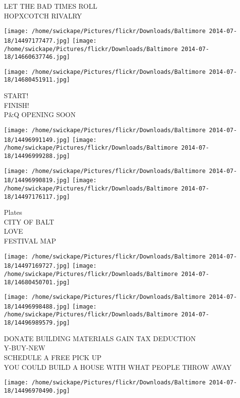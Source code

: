 \documentclass[10pt,letterpaper]{article}
\begin{document}
LET THE BAD TIMES ROLL\\
HOPXCOTCH RIVALRY\\
\pagebreak

\texttt{[image: /home/swickape/Pictures/flickr/Downloads/Baltimore 2014-07-18/14497177477.jpg]}
\texttt{[image: /home/swickape/Pictures/flickr/Downloads/Baltimore 2014-07-18/14660637746.jpg]}

\vspace{0.25in}
\texttt{[image: /home/swickape/Pictures/flickr/Downloads/Baltimore 2014-07-18/14680451911.jpg]}

START!\\
FINISH!\\
P\&Q OPENING SOON\\
\pagebreak

\texttt{[image: /home/swickape/Pictures/flickr/Downloads/Baltimore 2014-07-18/14496991149.jpg]}
\texttt{[image: /home/swickape/Pictures/flickr/Downloads/Baltimore 2014-07-18/14496999288.jpg]}

\texttt{[image: /home/swickape/Pictures/flickr/Downloads/Baltimore 2014-07-18/14496990819.jpg]}
\texttt{[image: /home/swickape/Pictures/flickr/Downloads/Baltimore 2014-07-18/14497176117.jpg]}

Plates\\
CITY OF BALT\\
LOVE\\
FESTIVAL MAP\\
\pagebreak

\texttt{[image: /home/swickape/Pictures/flickr/Downloads/Baltimore 2014-07-18/14497169727.jpg]}
\texttt{[image: /home/swickape/Pictures/flickr/Downloads/Baltimore 2014-07-18/14680450701.jpg]}

\texttt{[image: /home/swickape/Pictures/flickr/Downloads/Baltimore 2014-07-18/14496998488.jpg]}
\texttt{[image: /home/swickape/Pictures/flickr/Downloads/Baltimore 2014-07-18/14496989579.jpg]}

DONATE BUILDING MATERIALS GAIN TAX DEDUCTION\\
Y{-}BUY{-}NEW\\
SCHEDULE A FREE PICK UP\\
YOU COULD BUILD A HOUSE WITH WHAT PEOPLE THROW AWAY\\
\pagebreak

\texttt{[image: /home/swickape/Pictures/flickr/Downloads/Baltimore 2014-07-18/14496970490.jpg]}
\end{document}
